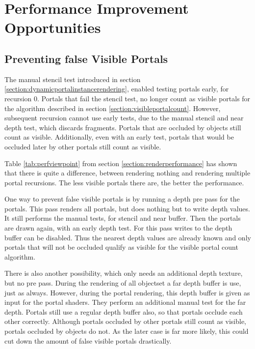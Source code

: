 \section{Performance Improvement Opportunities}

\subsection{Preventing false Visible Portals}
\label{section:falsevisible}
The manual stencil test introduced in section \ref{section:dynamicportalinstancerendering}, enabled testing portals early, for recursion 0. Portals that fail the stencil test, no longer count as visible portals for the algorithm described in section \ref{section:visibleportalcount}. However, subsequent recursion cannot use early tests, due to the manual stencil and near depth test, which discards fragments. Portals that are occluded by objects still count as visible. Additionally, even with an early test, portals that would be occluded later by other portals still count as visible.

Table \ref{tab:perfviewpoint} from section \ref{section:renderperformance} has shown that there is quite a difference, between rendering nothing and rendering multiple portal recursions. The less visible portals there are, the better the performance.


One way to prevent false visible portals is by running a depth pre pass for the portals. This pass renders all portals, but does nothing but to write depth values. It still performs the manual tests, for stencil and near buffer. Then the portals are drawn again, with an early depth test. For this pass writes to the depth buffer can be disabled. Thus the nearest depth values are already known and only portals that will not be occluded qualify as visible for the visible portal count algorithm.

There is also another possibility, which only needs an additional depth texture, but no pre pass. During the rendering of all \gls{objectset} a far depth buffer is use, just as always. However, during the portal rendering, this depth buffer is given as input for the portal shaders. They perform an additional manual test for the far depth. Portals still use a regular depth buffer also, so that portals occlude each other correctly. Although portals occluded by other portals still count as visible, portals occluded by objects do not. As the later case is far more likely, this could cut down the amount of false visible portals drastically.




